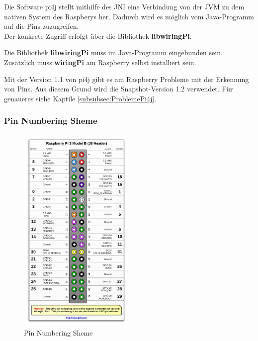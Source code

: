 Die Software \ac{pi4j} stellt mithilfe des \ac{JNI} eine Verbindung von der \ac{JVM} zu dem nativen System des Raspberys her. Dadurch wird es möglich vom Java-Programm auf die Pins zuzugreifen.
\\ Der konkrete Zugriff erfolgt über die Bibliothek \textbf{libwiringPi}.

\vspace{10pt}

Die Bibliothek \textbf{libwiringPi} muss im Java-Programm eingebunden sein. Zusätzlich muss \textbf{wiringPi} am Raspberry selbst installiert sein.

\vspace{10pt}

Mit der Version 1.1 von \ac{pi4j} gibt es am Raspberry Probleme mit der Erkennung von Pins. Aus diesem Grund wird die Snapshot-Version 1.2 verwendet. Für genaueres siehe Kaptile \ref{subsubsec:ProblemePi4j}.

\newpage

\subsubsection{Pin Numbering Sheme}

\begin{figure}
\vspace{-35pt}
  \begin{center}
    \includegraphics[width=0.50\textwidth]{Bilder/pi4j/PinNumberingSheme}
  \end{center}
  \caption[Pin Numbering Sheme]{Pin Numbering Sheme\protect\footnotemark}
  \label{Pin Numbering Sheme}
  \vspace{-120pt}
\end{figure}

